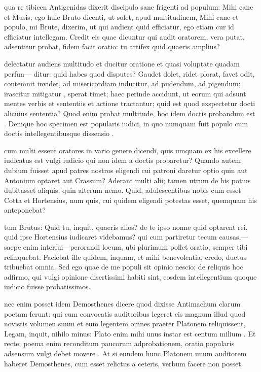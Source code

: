  qua re tibicen Antigenidas dixerit discipulo sane frigenti ad populum: Mihi cane et Musis; ego huic Bruto dicenti, ut solet, apud multitudinem, Mihi cane et populo, mi Brute, dixerim, ut qui audient quid efficiatur, ego etiam cur id efficiatur intellegam. Credit eis quae dicuntur qui audit oratorem, vera putat, adsentitur probat, fidem facit oratio: tu artifex quid quaeris amplius?

 delectatur audiens multitudo et ducitur oratione et quasi voluptate quadam perfun— ditur: quid habes quod disputes? Gaudet dolet, ridet plorat, favet odit, contemnit invidet, ad misericordiam inducitur, ad pudendum, ad pigendum; irascitur mitigatur , sperat timet; haec perinde accidunt, ut eorum qui adsunt mentes verbis et sententiis et actione tractantur; quid est quod exspectetur docti alicuius sententia? Quod enim probat multitude, hoc idem doctis probandum est . Denique hoc specimen est popularis iudici, in quo numquam fuit populo cum doctis intellegentibusque dissensio .

 cum multi essent oratores in vario genere dicendi, quis umquam ex his excellere iudicatus est vulgi iudicio qui non idem a doctis probaretur? Quando autem dubium fuisset apud patres nostros eligendi cui patroni daretur optio quin aut Antonium optaret aut Crassum? Aderant multi alii; tamen utrum de his potius dubitasset aliquis, quin alterum nemo. Quid, adulescentibus nobis cum esset Cotta et Hortensius, num quis, cui quidem eligendi potestas esset, quemquam his anteponebat?

 tum Brutus: Quid tu, inquit, quaeris alios? de te ipso nonne quid optarent rei, quid ipse Hortensius iudicaret videbamus? qui cum partiretur tecum causas,— saepe enim interfui—perorandi locum, ubi plurimum pollet oratio, semper tibi relinquebat. Faciebat ille quidem, inquam, et mihi benevolentia, credo, ductus tribuebat omnia. Sed ego quae de me populi sit opinio nescio; de reliquis hoc adfirmo, qui vulgi opinione disertissimi habiti sint, eosdem intellegentium quoque iudicio fuisse probatissimos.

 nec enim posset idem Demosthenes dicere quod dixisse Antimachum clarum poetam ferunt: qui cum convocatis auditoribus legeret eis magnum illud quod novistis volumen suum et eum legentem omnes praeter Platonem reliquissent, Legam, inquit, nihilo minus: Plato enim mihi unus instar est centum milium . Et recte; poema enim reconditum paucorum adprobationem, oratio popularis adsensum vulgi debet movere . At si eundem hunc Platonem unum auditorem haberet Demosthenes, cum esset relictus a ceteris, verbum facere non posset.

